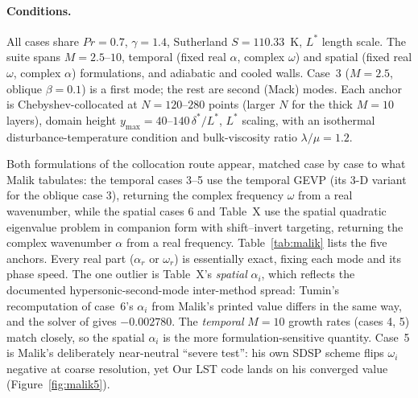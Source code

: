 \documentclass[11pt]{article}
\begin{document}
\paragraph{Conditions.} All cases share $Pr=0.7$, $\gamma=1.4$, Sutherland $S=110.33$~K, $L^\ast$
length scale. The suite spans $M=2.5$--$10$, temporal (fixed real $\alpha$, complex $\omega$) and
spatial (fixed real $\omega$, complex $\alpha$) formulations, and adiabatic and cooled walls.
Case~3 ($M=2.5$, oblique $\beta=0.1$) is a first mode; the rest are second (Mack) modes.
Each anchor is Chebyshev-collocated at $N=120$--$280$ points (larger $N$ for the thick $M=10$
layers), domain height $y_{\max}=40$--$140\,\delta^\ast/L^\ast$, $L^\ast$ scaling, with an isothermal
disturbance-temperature condition and bulk-viscosity ratio $\lambda/\mu=1.2$.

Both formulations of the collocation route appear, matched case by case to what Malik tabulates:
the temporal cases 3--5 use the temporal GEVP (its 3-D variant for the oblique case 3), returning
the complex frequency $\omega$ from a real wavenumber, while the spatial cases 6 and Table~X use the
spatial quadratic eigenvalue problem in companion form with shift--invert targeting, returning the
complex wavenumber $\alpha$ from a real frequency. Table~\ref{tab:malik} lists the five anchors. Every real part ($\alpha_r$ or $\omega_r$) is
essentially exact, fixing each mode and its phase speed. The one outlier is Table~X's \emph{spatial}
$\alpha_i$, which reflects the documented hypersonic-second-mode inter-method spread: Tumin's
recomputation of case~6's $\alpha_i$ from Malik's printed value differs in the same way, and the
solver of \cite{xirenfu2020} gives $-0.002780$. The \emph{temporal} $M=10$ growth rates (cases 4,
5) match closely, so the spatial $\alpha_i$ is the more formulation-sensitive quantity. Case~5 is
Malik's deliberately near-neutral ``severe test'': his own SDSP scheme flips $\omega_i$ negative at
coarse resolution, yet Our LST code lands on his converged value (Figure~\ref{fig:malik5}).
\end{document}
